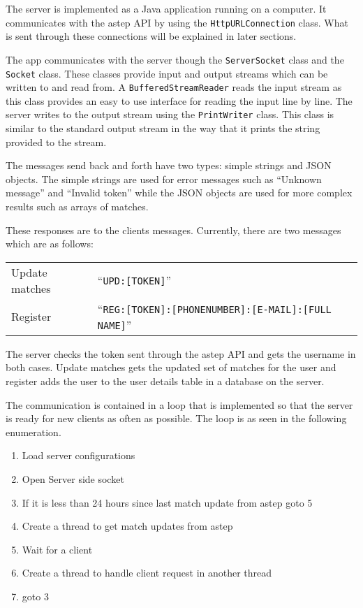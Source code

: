 The server is implemented as a Java application running on a computer.
It communicates with the \gls{astep} API by using the \texttt{HttpURLConnection} class.
What is sent through these connections will be explained in later sections.

The app communicates with the server though the \texttt{ServerSocket} class and the \texttt{Socket} class.
These classes provide input and output streams which can be written to and read from.
A \texttt{BufferedStreamReader} reads the input stream as this class provides an easy to use interface for reading the input line by line.
The server writes to the output stream using the \texttt{PrintWriter} class.
This class is similar to the standard output stream in the way that it prints the string provided to the stream.

The messages send back and forth have two types: simple strings and JSON objects.
The simple strings are used for error messages such as \enquote{Unknown message} and \enquote{Invalid token} while the JSON objects are used for more complex results such as arrays of matches.

These responses are to the clients messages.
Currently, there are two messages which are as follows:

{\centering
	\begin{tabular}{l l}
		Update matches & \enquote{\texttt{UPD:[TOKEN]}}\\
		Register & \enquote{\texttt{REG:[TOKEN]:[PHONENUMBER]:[E-MAIL]:[FULL NAME]}}
	\end{tabular}
}

The server checks the token sent through the \gls{astep} API and gets the username in both cases.
Update matches gets the updated set of matches for the user and register adds the user to the user details table in a database on the server.

The communication is contained in a loop that is implemented so that the server is ready for new clients as often as possible.
The loop is as seen in the following enumeration.

\begin{enumerate}
	\item Load server configurations
	\item Open Server side socket
	\item If it is less than 24 hours since last match update from \gls{astep} goto 5
	\item Create a thread to get match updates from \gls{astep}
	\item Wait for a client
	\item Create a thread to handle client request in another thread
	\item goto 3
\end{enumerate}

